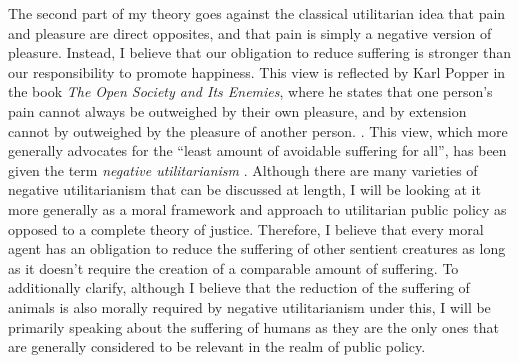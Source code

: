 \documentclass[12pt]{article}
\begin{document}
The second part of my theory goes against the classical utilitarian idea that pain and pleasure are direct opposites, and that pain is simply a negative version of pleasure. Instead, I believe that our obligation to reduce suffering is stronger than our responsibility to promote happiness.
This view is reflected by Karl Popper in the book \textit{The Open Society and Its Enemies}, where he states that one person's pain cannot always be outweighed by their own pleasure, and by extension cannot by outweighed by the pleasure of another person. \autocite[285]{popper2002}.
This view, which more generally advocates for the ``least amount of avoidable suffering for all'', has been given the term \textit{negative utilitarianism} \autocite[542]{smart1958}.
Although there are many varieties of negative utilitarianism that can be discussed at length, I will be looking at it more generally as a moral framework and approach to utilitarian public policy as opposed to a complete theory of justice.
Therefore, I believe that every moral agent has an obligation to reduce the suffering of other sentient creatures as long as it doesn't require the creation of a comparable amount of suffering.
To additionally clarify, although I believe that the reduction of the suffering of animals is also morally required by negative utilitarianism under this, I will be primarily speaking about the suffering of humans as they are the only ones that are generally considered to be relevant in the realm of public policy.

\newpage
\printbibliography{}
\end{document}
